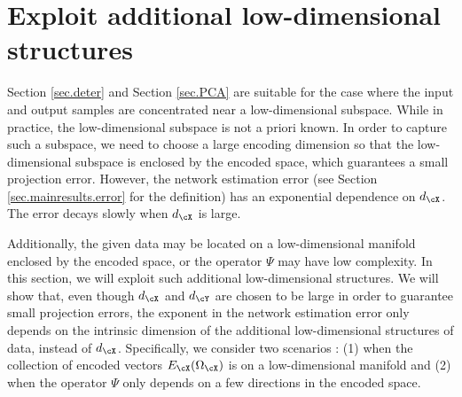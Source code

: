 \documentclass[11pt]{article} %
\begin{document}



\section{Exploit additional low-dimensional structures}\label{sec.lowD}

Section \ref{sec.deter} and Section \ref{sec.PCA} are suitable for the case where the input and output samples are concentrated near a low-dimensional subspace. While in practice, the low-dimensional subspace is not a priori known. In order to capture such a subspace, we need to choose a large encoding dimension so that the low-dimensional subspace is enclosed by the encoded space, which guarantees a small projection error. 
However, the network estimation error (see Section \ref{sec.mainresults.error} for the definition) has an exponential dependence on $d_{\cX}$. The error decays slowly when $d_{\cX}$ is large. %

Additionally, the given data may be located on a low-dimensional manifold enclosed by the encoded space, or the operator $\Psi$ may have low complexity. In this section, we will exploit such additional low-dimensional structures. We will show that, even though $d_{\cX}$ and $d_{\cY}$ are chosen to be large in order to guarantee small projection errors, the exponent in the network estimation error only depends on the intrinsic dimension of the additional low-dimensional structures of data, instead of $d_{\cX}$. Specifically, we consider two scenarios : (1) when the collection of encoded vectors $E_{\cX}(\Omega_{\cX})$ is on a low-dimensional manifold and (2) when the operator $\Psi$ only depends on a few directions in the encoded space. %
\end{document}
